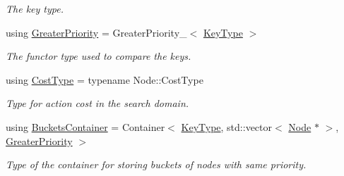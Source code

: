 \begin{DoxyCompactItemize}
\begin{DoxyCompactList}\small\item\em The key type. \end{DoxyCompactList}\item 
using \hyperlink{structslb_1_1ext_1_1policy_1_1openList_1_1BucketedStdMap__T_ab6c3ac3948a16366d3e06312a3381e3d}{Greater\+Priority} = Greater\+Priority\+\_\+$<$ \hyperlink{structslb_1_1ext_1_1policy_1_1openList_1_1BucketedStdMap__T_a1236fe314465155339798c0f9c4c5ca8}{Key\+Type} $>$\hypertarget{structslb_1_1ext_1_1policy_1_1openList_1_1BucketedStdMap__T_ab6c3ac3948a16366d3e06312a3381e3d}{}\label{structslb_1_1ext_1_1policy_1_1openList_1_1BucketedStdMap__T_ab6c3ac3948a16366d3e06312a3381e3d}

\begin{DoxyCompactList}\small\item\em The functor type used to compare the keys. \end{DoxyCompactList}\item 
using \hyperlink{structslb_1_1ext_1_1policy_1_1openList_1_1BucketedStdMap__T_a8736536dcf03af08b9df4b540c333535}{Cost\+Type} = typename Node\+::\+Cost\+Type\hypertarget{structslb_1_1ext_1_1policy_1_1openList_1_1BucketedStdMap__T_a8736536dcf03af08b9df4b540c333535}{}\label{structslb_1_1ext_1_1policy_1_1openList_1_1BucketedStdMap__T_a8736536dcf03af08b9df4b540c333535}

\begin{DoxyCompactList}\small\item\em Type for action cost in the search domain. \end{DoxyCompactList}\item 
using \hyperlink{structslb_1_1ext_1_1policy_1_1openList_1_1BucketedStdMap__T_ac3244479641693cce8338fa235e988d5}{Buckets\+Container} = Container$<$ \hyperlink{structslb_1_1ext_1_1policy_1_1openList_1_1BucketedStdMap__T_a1236fe314465155339798c0f9c4c5ca8}{Key\+Type}, std\+::vector$<$ \hyperlink{structslb_1_1ext_1_1policy_1_1openList_1_1BucketedStdMap__T_a20be12bd955d752d2ef9e78f7577c738}{Node} $\ast$ $>$, \hyperlink{structslb_1_1ext_1_1policy_1_1openList_1_1BucketedStdMap__T_ab6c3ac3948a16366d3e06312a3381e3d}{Greater\+Priority} $>$\hypertarget{structslb_1_1ext_1_1policy_1_1openList_1_1BucketedStdMap__T_ac3244479641693cce8338fa235e988d5}{}\label{structslb_1_1ext_1_1policy_1_1openList_1_1BucketedStdMap__T_ac3244479641693cce8338fa235e988d5}

\begin{DoxyCompactList}\small\item\em Type of the container for storing buckets of nodes with same priority. \end{DoxyCompactList}\end{DoxyCompactItemize}
